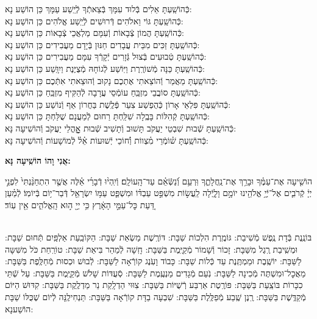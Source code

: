 \documentclass[twoside, openany, parskip=half, 11pt]{book}
\begin{document}
\begin{small}
כְּֿהוֹשַֽׁעְתָּ אֵלִים בְּֿלוּד עִמָּךְ בְּֿצֵאתְֿךָ לְֿיֵֽשַׁע עַמָּךְ \hfill כֵּן הוֹשַׁע נָא: \\
כְּֿהוֹשַֽׁעְתָּ גּוֹי וֵאלֹהִים דְּֿרוּשִׁים לְֿיֵֽשַׁע אֱלֹהִים \hfill כֵּן הוֹשַׁע נָא: \\
כְּֿהוֹשַֽׁעְתָּ הֲמוֹן צְֿבָאוֹת וְֿעִמָּם מַלְאֲכֵי צְֿבָאוֹת \hfill כֵּן הוֹשַׁע נָא: \\
כְּֿהוֹשַֽׁעְתָּ זַכִּים מִבֵּית עֲבָדִים חַנּוּן בְּֿיָדָם מַעֲבִידִים \hfill כֵּן הוֹשַׁע נָא: \\
כְּֿהוֹשַֽׁעְתָּ טְֿבוּעִים בְּֿצוּל גְּֿזָרִים יְֿקָרְֿךָ עִמָּם מַעֲבִירִים \hfill כֵּן הוֹשַׁע נָא: \\
כְּֿהוֹשַֽׁעְתָּ כַּנָּה מְֿשׁוֹרֶֽרֶת וַיּֽוֹשַׁע לְֿגוֹחָהּ מְֿצֻיֶּנֶת וַיִוָּֽשַׁע \hfill כֵּן הוֹשַׁע נָא: \\
כְּֿהוֹשַֽׁעְתָּ מַאֲמַר וְֿהוֹצֵאתִי אֶתְכֶם נָקוּב וְֿהוּצֵאתִי אִתְּֿכֶם \hfill כֵּן הוֹשַׁע נָא:\\
כְּֿהוֹשַֽׁעְתָּ סוֹבֲבֵי מִזְבֵּֽחַ עוֹמְֿסֵי עֲרָבָה לְֿהַקִּיף מִזְבֵּֽחַ \hfill כֵּן הוֹשַׁע נָא: \\
כְּֿהוֹשַֽׁעְתָּ פִּלְאֵי אָרוֹן כְּֿהֻפְשַׁע צִעֵר פְּֿלֶֽשֶׁת בַּחֲרוֹן אַף וְֿנוֹשַׁע \hfill כֵּן הוֹשַׁע נָא:\\
כְּֿהוֹשַֽׁעְתָּ קְֿהִלּוֹת בָּבֶֽלָה שִׁלַּֽחְתָּ רַחוּם לְֿמַעֲנָם שֻׁלַּחְתָּ \hfill כֵּן הוֹשַׁע נָא:\\

כְּֿהוֹשַֽׁעְתָּ שְֿׁבוּת שִׁבְטֵי יַעֲקֹב תָּשׁוּב וְֿתָשִׁיב שְֿׁבוּת אׇׇׇׇָהֳלֵי יַעֲקֹב \hfill וְֿהוֹשִׁיעָה נָּא:\\
כְּֿהוֹשַֽׁעְתָּ שׁ֗וֹמְֿרֵי מִ֗צְווֹת וְֿ֗חוֹכֵי יְֿשׁוּעוֹת אֵ֗ל֗ לְֿמוֹשָׁעוֹת \hfill וְֿהוֹשִׁיעָה נָּא:

\end{small}

\begin{large}
\textbf{אֲנִי וָהוֹ הוֹשִֽׁיעָה נָּא:}
\end{large}

הוֹשִׁ֤יעָה אֶת־עַמֶּ֗ךָ וּבָרֵ֥ךְ אֶת־נַֽחֲלָתֶ֑ךָ וּֽרְעֵ֥ם וְֿ֝נַשְּֿׂאֵ֗ם עַד־הָֽעוֹלָֽם׃ וְֿיִֽהְי֨וּ דְֿבָרַ֜י אֵ֗לֶּה אֲשֶׁ֤ר הִתְחַנַּ֨נְתִּי֙ לִפְנֵ֣י יְיָ֔ קְֿרֹבִ֛ים אֶל־יְֿיָ֥ אֱלֹהֵ֖ינוּ יוֹמָ֣ם וָלָ֑יְֿלָה לַֽעֲשׂ֣וֹת מִשְׁפַּ֣ט עַבְדּ֗וֹ וּמִשְׁפַּ֛ט עַמּ֥וֹ יִשְׂרָאֵ֖ל דְּֿבַר־י֥וֹם בְּֿיוֹמֽוֹ׃ לְֿמַ֗עַן דַּ֚עַת כׇּל־עַמֵּ֣י הָאָ֔רֶץ כִּ֥י יְיָ֖ ה֣וּא הָֽאֱלֹהִ֑ים אֵ֖ין עֽוֹד׃

\sepline

\\
בּוֹנֶֽנֶת בְּֿדָת נֶֽפֶשׁ מְֿשִׁיבַת: גּוֹמֶֽרֶת הִלְכוֹת שַׁבָּת: דּוֹרֶֽשֶׁת מַשְׂאַת שַׁבָּת: הַקּוֹבַֽעַת אַלְפַּֽיִם תְּֿחוּם שַׁבָּת: וּמְשִֽׁיבַת רֶֽגֶל מִשַּׁבָּת: זָכוֹר וְֿשָׁמוֹר מְֿקַיֶּֽמֶת בַּשַּׁבָּת: חָֽשָׁה לְֿמַהֵר בִּיאַת שַׁבָּת: טוֹרַֽחַת כֹּל מִשִּׁשָּה לַשַּׁבָּת: יוֹשֶֽׁבֶת וּמַמְתֶּֽנֶת עַד כְּֿלוֹת שַׁבָּת: כָּבוֹד וָעֹֽנֶג קוֹרְֿאָה לַשַּׁבָּת: לְֿבוּשׁ וּכְסוּת מְֿחַלֶּֽפֶת בַּשַּׁבָּת: מַאֲכׇל־וּמִשְׁתֶּה מְֿכִינָה לַשַּׁבָּת: נֹֽעַם מְֿגָדִים מַנְעֶֽמֶת לַשַּׁבָּת: סְֿעֻדּוֹת שָׁלֹשׁ מְֿקַיֶּֽמֶת בַּשַּׁבָּת: עַל שְֿׁתֵּי כִכָּרוֹת בּוֹצַֽעַת בַּשַּׁבָּת: פּוֹרֶֽטֶת אַרְבַּע רְֿשֻׁיּוֹת בַּשַּׁבָּת: צִוּוּי הַדְלָֽקַת נֵר מַדְלֶֽקֶת בַּשַּׁבָּת: קִדּוּשׁ הַיּוֹם מְֿקַדֶּֽשֶׁת בַּשַּׁבָּת: רֶֽנֶן שֶֽׁבַע מְֿפַלֶּֽלֶת בַּשַּׁבָּת: שִׁבְעָה בַדָּת קוֹרְֿאָה בַּשַּׁבָּת: תַּנְחִילֶֽנָּה לְֿיוֹם שֶׁכֻּלּוֹ שַׁבָּת הוֹשַׁענָא:
\end{document}
